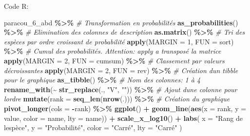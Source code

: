 \documentclass[
  11pt,
  american,
  a4paper,
  extrafontsizes,onecolumn,openright
  ]{memoir}
\newenvironment{Shaded}{\begin{snugshade}}{\end{snugshade}}
\newcommand{\AttributeTok}[1]{\textcolor[rgb]{0.13,0.29,0.53}{#1}}
\newcommand{\CommentTok}[1]{\textcolor[rgb]{0.56,0.35,0.01}{\textit{#1}}}
\newcommand{\DecValTok}[1]{\textcolor[rgb]{0.00,0.00,0.81}{#1}}
\newcommand{\FunctionTok}[1]{\textcolor[rgb]{0.13,0.29,0.53}{\textbf{#1}}}
\newcommand{\NormalTok}[1]{#1}
\newcommand{\SpecialCharTok}[1]{\textcolor[rgb]{0.81,0.36,0.00}{\textbf{#1}}}
\newcommand{\StringTok}[1]{\textcolor[rgb]{0.31,0.60,0.02}{#1}}
\begin{document}
\normalsize

Code R:

\scriptsize

\begin{Shaded}
\begin{Highlighting}[]
\NormalTok{paracou\_6\_abd }\SpecialCharTok{\%\textgreater{}\%}
  \CommentTok{\# Transformation en probabilités}
  \FunctionTok{as\_probabilities}\NormalTok{() }\SpecialCharTok{\%\textgreater{}\%}
  \CommentTok{\# Elimination des colonnes de description}
  \FunctionTok{as.matrix}\NormalTok{() }\SpecialCharTok{\%\textgreater{}\%} 
  \CommentTok{\# Tri des espèces par ordre croissant de probabilité}
  \FunctionTok{apply}\NormalTok{(}\AttributeTok{MARGIN =} \DecValTok{1}\NormalTok{, }\AttributeTok{FUN =}\NormalTok{ sort) }\SpecialCharTok{\%\textgreater{}\%} 
  \CommentTok{\# Cumul des probabilités. Attention: apply a transposé la matrice}
  \FunctionTok{apply}\NormalTok{(}\AttributeTok{MARGIN =} \DecValTok{2}\NormalTok{, }\AttributeTok{FUN =}\NormalTok{ cumsum) }\SpecialCharTok{\%\textgreater{}\%} 
  \CommentTok{\# Classement par valeurs décroissantes}
  \FunctionTok{apply}\NormalTok{(}\AttributeTok{MARGIN =} \DecValTok{2}\NormalTok{, }\AttributeTok{FUN =}\NormalTok{ rev) }\SpecialCharTok{\%\textgreater{}\%} 
  \CommentTok{\# Création d\textquotesingle{}un tibble pour le graphique}
  \FunctionTok{as\_tibble}\NormalTok{() }\SpecialCharTok{\%\textgreater{}\%} 
  \CommentTok{\# Nom des colonnes: 1 à 4}
  \FunctionTok{rename\_with}\NormalTok{(}\SpecialCharTok{\textasciitilde{}} \FunctionTok{str\_replace}\NormalTok{(., }\StringTok{"V"}\NormalTok{, }\StringTok{""}\NormalTok{)) }\SpecialCharTok{\%\textgreater{}\%} 
  \CommentTok{\# Ajout d\textquotesingle{}une colonne pour l\textquotesingle{}ordre}
  \FunctionTok{mutate}\NormalTok{(}\AttributeTok{rank =} \FunctionTok{seq\_len}\NormalTok{(}\FunctionTok{nrow}\NormalTok{(.))) }\SpecialCharTok{\%\textgreater{}\%} 
  \CommentTok{\# Création du graphique}
  \FunctionTok{pivot\_longer}\NormalTok{(}\AttributeTok{cols =} \SpecialCharTok{{-}}\NormalTok{rank) }\SpecialCharTok{\%\textgreater{}\%} 
  \FunctionTok{ggplot}\NormalTok{() }\SpecialCharTok{+}
    \FunctionTok{geom\_line}\NormalTok{(}\FunctionTok{aes}\NormalTok{(}\AttributeTok{x =}\NormalTok{ rank, }\AttributeTok{y =}\NormalTok{ value, }\AttributeTok{color =}\NormalTok{ name, }\AttributeTok{lty =}\NormalTok{ name)) }\SpecialCharTok{+}
    \FunctionTok{scale\_x\_log10}\NormalTok{() }\SpecialCharTok{+}
    \FunctionTok{labs}\NormalTok{(}
      \AttributeTok{x =} \StringTok{"Rang de l\textquotesingle{}espèce"}\NormalTok{, }
      \AttributeTok{y =} \StringTok{"Probabilité"}\NormalTok{, }
      \AttributeTok{color =} \StringTok{"Carré"}\NormalTok{,}
      \AttributeTok{lty =} \StringTok{"Carré"}
\NormalTok{    ) }
\end{Highlighting}
\end{Shaded}
\end{document}
